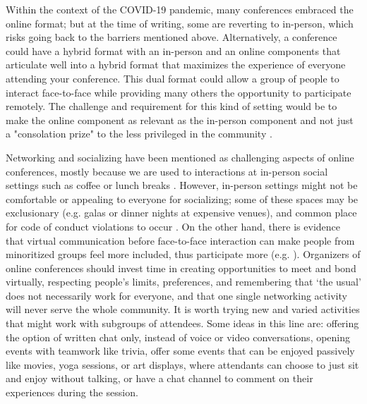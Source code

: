 \documentclass[10pt,letterpaper]{article}
\begin{document}
Within the context of the COVID-19 pandemic, many conferences embraced the online format; but at the time of writing, some are reverting to in-person, which risks going back to the barriers mentioned above.
Alternatively, a conference could have a hybrid format with an in-person and an online components that articulate well into a hybrid format that maximizes the experience of everyone attending your conference. This dual format could allow a group of people to interact face-to-face while providing many others the opportunity to participate remotely. 
The challenge and requirement for this kind of setting would be to make the online component as relevant as the in-person component and not just a "consolation prize" to the less privileged in the community \cite{ninerBetterWhomLeveling2021}.

Networking and socializing have been mentioned as challenging aspects of online conferences, mostly because we are used to interactions at in-person social settings such as coffee or lunch breaks \cite{salibaGettingGripsOnline2020, roosOnlineConferencesNew2020}. 
However, in-person settings might not be comfortable or appealing to everyone for socializing; 
some of these spaces may be exclusionary (e.g. galas or dinner nights at expensive venues), and common place for code of conduct violations to occur \cite{auroraHowRespondCode2019}. 
On the other hand, there is evidence that virtual communication before face-to-face interaction can make people from minoritized groups feel more included, thus participate more (e.g. \cite{trianaDoesOrderFacetoFace2012, blackEngenderingBelongingThoughtful2020}). 
Organizers of online conferences should invest time in creating opportunities to meet and bond virtually, respecting people's limits, preferences, and remembering that `the usual' does not necessarily work for everyone, and that one single networking activity will never serve the whole community. 
It is worth trying new and varied activities that might work with subgroups of attendees.
Some ideas in this line are: offering the option of written chat only, instead of voice or video conversations, opening events with teamwork like trivia, offer some events that can be enjoyed passively like movies, yoga sessions, or art displays, where attendants can choose to just sit and enjoy without talking, or have a chat channel to comment on their experiences during the session.
\end{document}
